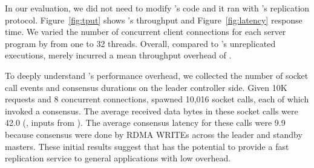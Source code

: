 In our evaluation, we did not need to modify \redis's code and it ran with 
\xxx's replication protocol. Figure~\ref{fig:tput} shows \xxx's throughput and 
Figure~\ref{fig:latency} response time. We varied the number of concurrent 
client connections for each server program by from one to 32 threads. Overall, 
compared to \redis's unreplicated executions, \xxx merely incurred a mean 
throughput overhead of \tputoverhead. 

To deeply understand \xxx's performance overhead, we collected the number of 
socket call events and consensus durations on the leader controller side. Given 
10K requests and 8 concurrent connections, \redis spawned 10,016 socket calls, 
each of which invoked a \paxos consensus. The average received data bytes in 
these socket calls were 42.0 (\eg, inputs from \recv). The average consensus 
latency for these calls were 9.9 \us because consensus were done by RDMA WRITEs 
across the leader and standby masters. These initial results suggest that \xxx 
has the potential to provide a fast \paxos replication service to general 
applications with low overhead. 





% 


